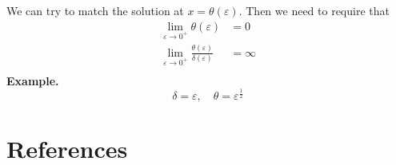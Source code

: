 \documentclass{article}
\theoremstyle{remark}
\begin{document}
\begin{enumerate}[label=(\roman*)]
We can try to match the solution at $x = \theta \left( \varepsilon  \right)$. Then we need to require that \[
  \begin{split}
\lim_{\varepsilon  \to  0^{+}}  \theta \left( \varepsilon  \right)   & = 0 \\
\lim_{\varepsilon \to 0^{+}} \frac{\theta \left( \varepsilon  \right)}{\delta \left( \varepsilon  \right)}  &= \infty \\
  \end{split} 
\] 
\textbf{Example.} 
\[
\delta  =\varepsilon , \quad  \theta = \varepsilon ^{\frac{1}{2}} 
\] 




\end{enumerate}










\newpage

\section{References}%
\label{sec:references}


  


\end{document}
